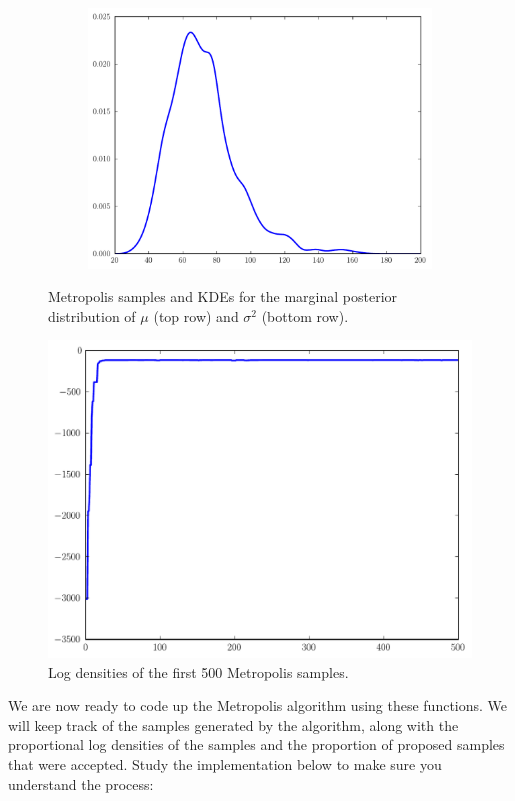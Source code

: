 \begin{figure}
\begin{subfigure}[b]{.49\textwidth}
	\end{subfigure}
	\begin{subfigure}[b]{.49\textwidth}
		\centering
		\includegraphics[width=.75\textwidth]{sig_kernel.pdf}
	\end{subfigure}
\caption{Metropolis samples and KDEs for the marginal posterior distribution of $\mu$ (top row) and $\sigma^2$ (bottom row).}
\label{fig:metropolis_results}
\end{figure}
\begin{figure}
\centering
\includegraphics[width=.75\textwidth]{logprobs.pdf}
\caption{Log densities of the first 500 Metropolis samples.}
\label{fig:logprobs}
\end{figure}
We are now ready to code up the Metropolis algorithm using these functions.
We will keep track of the samples generated by the algorithm, along with the proportional log densities of the
samples and the proportion of proposed samples that were accepted. Study the implementation below to make sure
you understand the process:
